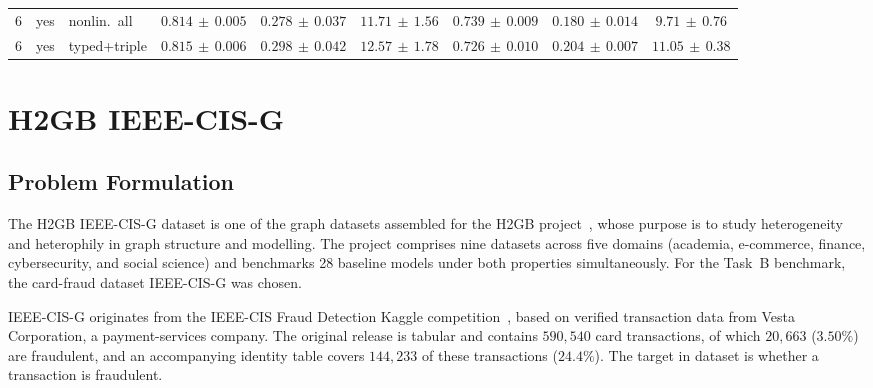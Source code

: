 \begin{table}[H]
{\begin{tabular}{ccl ccc ccc}
    6 & yes & nonlin.\ all     & $0.814{\scriptstyle\,\pm\,0.005}$ & $0.278{\scriptstyle\,\pm\,0.037}$ & $11.71{\scriptstyle\,\pm\,1.56}$ & $0.739{\scriptstyle\,\pm\,0.009}$ & $0.180{\scriptstyle\,\pm\,0.014}$ & $9.71{\scriptstyle\,\pm\,0.76}$ \\
    6 & yes & typed+triple     & $0.815{\scriptstyle\,\pm\,0.006}$ & $0.298{\scriptstyle\,\pm\,0.042}$ & $12.57{\scriptstyle\,\pm\,1.78}$ & $0.726{\scriptstyle\,\pm\,0.010}$ & $0.204{\scriptstyle\,\pm\,0.007}$ & $11.05{\scriptstyle\,\pm\,0.38}$ \\
    \bottomrule
  \end{tabular}%
  }
\end{table}

\section{H2GB IEEE-CIS-G}
\label{sec:ieee-cis}

\subsection{Problem Formulation}
\label{sec:ieee-problem}

The H2GB IEEE-CIS-G dataset is one of the graph datasets assembled for the H2GB project~\cite{lin2025h2gb,h2gb}, whose purpose is to study heterogeneity and heterophily in graph structure and modelling.
The project comprises nine datasets across five domains (academia, e-commerce, finance, cybersecurity, 
and social science) and benchmarks 28 baseline models under both properties simultaneously.
For the Task~B benchmark, the card-fraud dataset IEEE-CIS-G was chosen.

IEEE-CIS-G originates from the IEEE-CIS Fraud Detection Kaggle
competition~\cite{howard2019ieeecis}, based on verified transaction data from Vesta Corporation, a
payment-services company.
The original release is tabular and contains $590{,}540$ card transactions, of which $20{,}663$ ($3.50\%$) 
are fraudulent, and an accompanying identity table covers $144{,}233$ of these transactions ($24.4\%$).
The target in dataset is whether a transaction is fraudulent.

